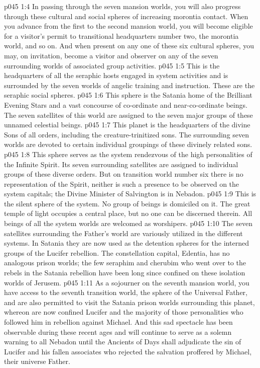 \vs p045 1:4 In passing through the seven mansion worlds, you will also progress through these cultural and social spheres of increasing morontia contact. When you advance from the first to the second mansion world, you will become eligible for a visitor’s permit to transitional headquarters number two, the morontia world, and so on. And when present on any one of these six cultural spheres, you may, on invitation, become a visitor and observer on any of the seven surrounding worlds of associated group activities.
\pc \vs p045 1:5  This is the headquarters of all the seraphic hosts engaged in system activities and is surrounded by the seven worlds of angelic training and instruction. These are the seraphic social spheres.
\pc \vs p045 1:6  This sphere is the Satania home of the Brilliant Evening Stars and a vast concourse of co\hyp{}ordinate and near\hyp{}co\hyp{}ordinate beings. The seven satellites of this world are assigned to the seven major groups of these unnamed celestial beings.
\pc \vs p045 1:7  This planet is the headquarters of the divine Sons of all orders, including the creature\hyp{}trinitized sons. The surrounding seven worlds are devoted to certain individual groupings of these divinely related sons.
\pc \vs p045 1:8  This sphere serves as the system rendezvous of the high personalities of the Infinite Spirit. Its seven surrounding satellites are assigned to individual groups of these diverse orders. But on transition world number six there is no representation of the Spirit, neither is such a presence to be observed on the system capitals; the Divine Minister of Salvington is  in Nebadon.
\pc \vs p045 1:9  This is the silent sphere of the system. No group of beings is domiciled on it. The great temple of light occupies a central place, but no one can be discerned therein. All beings of all the system worlds are welcomed as worshipers.
\vs p045 1:10 The seven satellites surrounding the Father’s world are variously utilized in the different systems. In Satania they are now used as the detention spheres for the interned groups of the Lucifer rebellion. The constellation capital, Edentia, has no analogous prison worlds; the few seraphim and cherubim who went over to the rebels in the Satania rebellion have been long since confined on these isolation worlds of Jerusem.
\vs p045 1:11 As a sojourner on the seventh mansion world, you have access to the seventh transition world, the sphere of the Universal Father, and are also permitted to visit the Satania prison worlds surrounding this planet, whereon are now confined Lucifer and the majority of those personalities who followed him in rebellion against Michael. And this sad spectacle has been observable during these recent ages and will continue to serve as a solemn warning to all Nebadon until the Ancients of Days shall adjudicate the sin of Lucifer and his fallen associates who rejected the salvation proffered by Michael, their universe Father.

